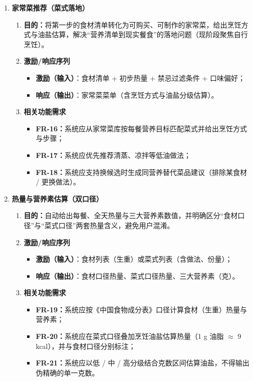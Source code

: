 \documentclass[12pt,a4paper]{ctexart}
\begin{document}
\begin{enumerate}
\item \textbf{家常菜推荐（菜式落地）}
  \begin{enumerate}[label=(\arabic*), leftmargin=10pt, itemsep=2pt, topsep=2pt]
    \item \textbf{目的：}将第一步的食材清单转化为可购买、可制作的家常菜，给出烹饪方式与油盐估算，解决“营养清单到现实餐食”的落地问题（现阶段聚焦自行烹饪）。
    \item \textbf{激励/响应序列}
      \begin{itemize}[leftmargin=*, itemsep=1pt, topsep=1pt]
        \item \textbf{激励（输入）}：食材清单 + 初步热量 + 禁忌过滤条件 + 口味偏好；
        \item \textbf{响应（输出）}：家常菜菜单（含烹饪方式与油盐分级估算）。
      \end{itemize}
    \item \textbf{相关功能需求}
      \begin{itemize}[leftmargin=*, itemsep=1pt, topsep=1pt]
        \item \textbf{FR-16：}系统应从家常菜库按每餐营养目标匹配菜式并给出烹饪方式与步骤；
        \item \textbf{FR-17：}系统应优先推荐清蒸、凉拌等低油做法；
        \item \textbf{FR-18：}系统应支持换候选时生成同营养替代菜品建议（排除某食材 / 更换做法）。
      \end{itemize}
  \end{enumerate}

\item \textbf{热量与营养素估算（双口径）}
  \begin{enumerate}[label=(\arabic*), leftmargin=10pt, itemsep=2pt, topsep=2pt]
    \item \textbf{目的：}自动给出每餐、全天热量与三大营养素数值，并明确区分“食材口径”与“菜式口径”两套热量含义，避免用户混淆。
    \item \textbf{激励/响应序列}
      \begin{itemize}[leftmargin=*, itemsep=1pt, topsep=1pt]
        \item \textbf{激励（输入）}：食材列表（生重）或菜式列表（含做法、份量）；
        \item \textbf{响应（输出）}：食材口径热量、菜式口径热量、三大营养素（克）。
      \end{itemize}
    \item \textbf{相关功能需求}
      \begin{itemize}[leftmargin=*, itemsep=1pt, topsep=1pt]
        \item \textbf{FR-19：}系统应按《中国食物成分表》口径计算食材（生重）热量与营养素；
        \item \textbf{FR-20：}系统应在菜式口径叠加烹饪油盐估算热量（1 g 油脂 $\approx$ 9 kcal），并与食材口径分别标注；
        \item \textbf{FR-21：}系统应以低 / 中 / 高分级结合克数区间估算油盐，不得输出伪精确的单一克数。
      \end{itemize}
  \end{enumerate}


\end{enumerate}
\end{document}
